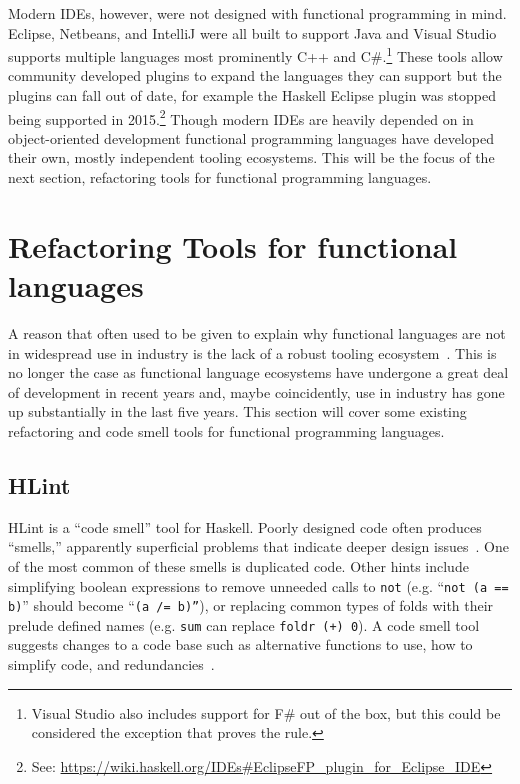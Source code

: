Modern IDEs, however, were not designed with functional programming in mind. Eclipse, Netbeans, and IntelliJ were all built to support Java and Visual Studio supports multiple languages most prominently C++ and C\#.\footnote{Visual Studio also includes support for F\# out of the box, but this could be considered the exception that proves the rule.} These tools allow community developed plugins to expand the languages they can support but the plugins can fall out of date, for example the Haskell Eclipse plugin was stopped being supported in 2015.\footnote{See: \url{https://wiki.haskell.org/IDEs\#EclipseFP_plugin_for_Eclipse_IDE}} Though modern IDEs are heavily depended on in object-oriented development functional programming languages have developed their own, mostly independent tooling ecosystems. This will be the focus of the next section, refactoring tools for functional programming languages.

\section{Refactoring Tools for functional languages}\label{funcTools}
A reason that often used to be given to explain why functional languages are not in widespread use in industry is the lack of a robust tooling ecosystem~\citep{wadlerTools}. This is no longer the case as functional language ecosystems have undergone a great deal of development in recent years and, maybe coincidently, use in industry has gone up substantially in the last five years. This section will cover some existing refactoring and code smell tools for functional programming languages.

\subsection{HLint}

HLint is a ``code smell'' tool for Haskell. Poorly designed code often produces ``smells,'' apparently superficial problems that indicate deeper design issues~\citep{fowler}. One of the most common of these smells is duplicated code. Other hints include simplifying boolean expressions to remove unneeded calls to \texttt{not} (e.g. ``\texttt{not (a == b)}'' should become ``\texttt{(a /= b)''}), or replacing common types of folds with their prelude defined names (e.g. \texttt{sum} can replace \texttt{foldr (+) 0}). A code smell tool suggests changes to a code base such as alternative functions to use, how to simplify code, and redundancies~\citep{hlint}.

